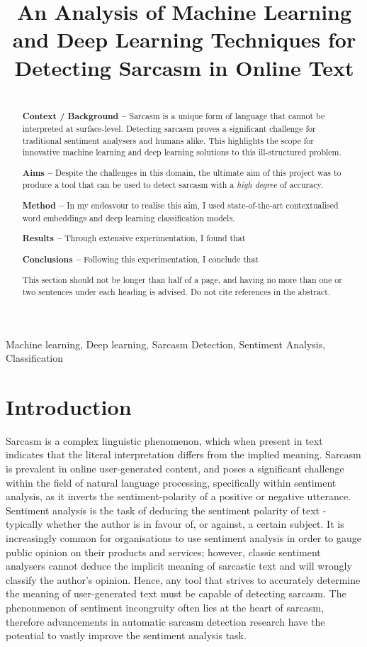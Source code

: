 \documentclass[12pt,a4paper]{article}
\title{An Analysis of Machine Learning and Deep Learning Techniques for Detecting Sarcasm in Online Text}
\author{} %
\date{}
\begin{document}
\maketitle

\begin{abstract}
\\ \indent \textbf{Context / Background --} 
Sarcasm is a unique form of language that cannot be interpreted at surface-level. Detecting sarcasm proves a significant challenge for traditional sentiment analysers and humans alike. This highlights the scope for innovative machine learning and deep learning solutions to this ill-structured problem.

\indent \textbf{Aims --} Despite the challenges in this domain, the ultimate aim of this project was to produce a tool that can be used to detect sarcasm with a \textit{high degree} of accuracy. 

\indent \textbf{Method --} In my endeavour to realise this aim, I used state-of-the-art contextualised word embeddings and deep learning classification models.

\indent \textbf{Results --} Through extensive experimentation, I found that

\indent \textbf{Conclusions --} Following this experimentation, I conclude that

This section should not be longer than half of a page, and having no more than one or two sentences under each heading is advised. Do not cite references in the abstract.
\end{abstract}

\begin{keywords}
Machine learning, Deep learning, Sarcasm Detection, Sentiment Analysis, Classification
\end{keywords}


\section{Introduction}
\noindent Sarcasm is a complex linguistic phenomenon, which when present in text indicates that the literal interpretation differs from the implied meaning. Sarcasm is prevalent in online user-generated content, and poses a significant challenge within the field of natural language processing, specifically within sentiment analysis, as it inverts the sentiment-polarity of a positive or negative utterance. Sentiment analysis is the task of deducing the sentiment polarity of text - typically whether the author is in favour of, or against, a certain subject. It is increasingly common for organisations to use sentiment analysis in order to gauge public opinion on their products and services; however, classic sentiment analysers cannot deduce the implicit meaning of sarcastic text and will wrongly classify the author's opinion. Hence, any tool that strives to accurately determine the meaning of user-generated text must be capable of detecting sarcasm. The phenonmenon of sentiment incongruity often lies at the heart of sarcasm, therefore advancements in automatic sarcasm detection research have the potential to vastly improve the sentiment analysis task.
\end{document}
